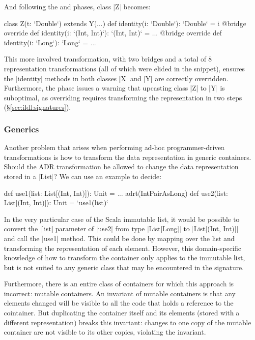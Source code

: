 And following the \coerce{} and \commit{} phases, class |Z| becomes:

\begin{lstlisting-nobreak}
class Z(t: `Double`) extends Y(...) {
  def identity(i: `Double`): `Double` = i
  @bridge override def identity(i: `(Int, Int)`): `(Int, Int)` = ...
  @bridge override def identity(i: `Long`): `Long` = ...
}
\end{lstlisting-nobreak}

This more involved transformation, with two bridges and a total of 8 representation transformations (all of which were elided in the snippet), ensures the |identity| methods in both classes |X| and |Y| are correctly overridden. Furthermore, the \bridge{} phase issues a warning that upcasting class |Z| to |Y| is suboptimal, as overriding requires transforming the representation in two steps (\S\ref{sec:ildl:signatures}).

\subsubsection{Generics}
Another problem that arises when performing ad-hoc programmer-driven transformations is how to transform the data representation in generic containers. Should the ADR transformation be allowed to change the data representation stored in a |List|? We can use an example to decide:

\begin{lstlisting-nobreak}
def use1(list: List[(Int, Int)]): Unit = ...
adrt(IntPairAsLong) {
  def use2(list: List[(Int, Int)]): Unit = `use1(list)`
}
\end{lstlisting-nobreak}

In the very particular case of the Scala immutable list, it would be possible to convert the |list| parameter of |use2| from type |List[Long]| to |List[(Int, Int)]| and call the |use1| method. This could be done by mapping over the list and transforming the representation of each element. However, this domain-specific knowledge of how to transform the container only applies to the immutable list, but is not suited to any generic class that may be encountered in the signature.

Furthermore, there is an entire class of containers for which this approach is incorrect: mutable containers. An invariant of mutable containers is that any elements changed will be visible to all the code that holds a reference to the cointainer. But duplicating the container itself and its elements (stored with a different representation) breaks this invariant: changes to one copy of the mutable container are not visible to its other copies, violating the invariant.

